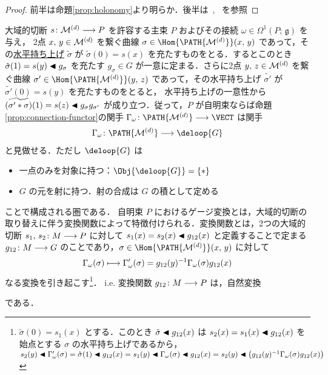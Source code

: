 \documentclass[TQFT_main]{subfiles}
\begin{document}
\begin{proof}
    前半は命題\ref{prop:holonomy}より明らか．後半は~\cite{Baez2004holonomy}, ~\cite{barrett1991holonomy}を参照
\end{proof}

大域的切断 $s \colon \mathcal{M}^{(d)} \longrightarrow P$ を許容する主束 $P$ およびその接続 $\omega \in \Omega^1(P;\, \mathfrak{g})$ を与え，
2点 $x,\, y \in \mathcal{M}^{(d)}$ を繋ぐ曲線 $\sigma \in \Hom{\PATH{\mfdcal{M}{d}}}(x,\, y)$ であって，その\hyperref[def:horizontal-lift-curve]{水平持ち上げ} $\tilde{\sigma}$ が $\tilde{\sigma} (0) = s(x)$ を充たすものをとる．するとこのとき
$\tilde{\sigma}(1) = s(y) \blacktriangleleft g_\sigma$ を充たす $g_\sigma \in G$ が一意に定まる．さらに2点 $y,\, z \in \mathcal{M}^{(d)}$ を繋ぐ曲線 $\sigma' \in \Hom{\PATH{\mfdcal{M}{d}}}(y,\, z)$ であって，その水平持ち上げ $\tilde{\sigma'}$ が $\tilde{\sigma'}(0) = s(y)$ を充たすものをとると，
水平持ち上げの一意性から $\widetilde{(\sigma' * \sigma)} (1) = s(z) \blacktriangleleft g_\sigma g_{\sigma'}$ が成り立つ．従って，$P$ が自明束ならば命題\ref{prop:connection-functor}の関手 $\Gamma_\omega \colon \PATH{\mfdcal{M}{d}} \lto \VECT$ は関手
\begin{align}
    \Gamma_\omega \colon \PATH{\mfdcal{M}{d}} \lto \deloop{G}
\end{align}
と見做せる．ただし $\deloop{G}$ は
\begin{itemize}
    \item 一点のみを対象に持つ：$\Obj{\deloop{G}} = \{*\}$
    \item $G$ の元を射に持つ．射の合成は $G$ の積として定める
\end{itemize}
ことで構成される圏である．
自明束 $P$ におけるゲージ変換とは，大域的切断の取り替えに伴う変換関数によって特徴付けられる．変換関数とは，2つの大域的切断 $s_1,\, s_2 \colon M \longrightarrow P$ に対して $s_1(x) = s_2(x) \blacktriangleleft g_{12}(x)$ と定義することで定まる $g_{12} \colon M \longrightarrow G$ のことであり，$\sigma \in \Hom{\PATH{\mfdcal{M}{d}}}(x,\, y)$ に対して
\begin{align}
    \label{eq:gauge-transform-trivial}
    \Gamma_\omega (\sigma) \longmapsto \Gamma'_\omega (\sigma) = g_{12}(y)^{-1} \Gamma_\omega(\sigma) g_{12}(x)
\end{align}
なる変換を引き起こす\footnote{$\tilde{\sigma}(0) = s_1(x)$ とする．このとき $\tilde{\sigma} \blacktriangleleft g_{12}(x)$ は $s_2(x) = s_1(x) \blacktriangleleft g_{12} (x)$ を始点とする $\sigma$ の水平持ち上げであるから，$s_2(y) \blacktriangleleft \Gamma'_\omega(\sigma) = \tilde{\sigma}(1) \blacktriangleleft g_{12}(x) = s_1(y) \blacktriangleleft \Gamma_\omega(\sigma) \blacktriangleleft g_{12}(x) = s_2(y) \blacktriangleleft \bigl( g_{12}(y)^{-1} \Gamma_\omega(\sigma)g_{12}(x) \bigr)$}．
i.e. 変換関数 $g_{12} \colon M \longrightarrow P$ は，自然変換
\begin{center}
\end{center}
である．
\end{document}

